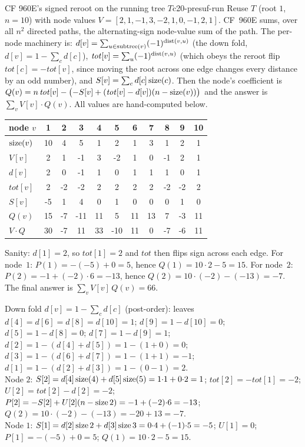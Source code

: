 \begin{example}{CF 960E's signed reroot on the running tree $T$}{c20-presuf-run}
Reuse $T$ (root $1$, $n=10$) with node values $V=[2,1,-1,3,-2,1,0,-1,2,1]$.
CF~960E sums, over all $n^2$ directed paths, the alternating-sign node-value
sum of the path. The per-node machinery is: $d[v]=\sum_{u\in\operatorname{subtree}(v)}
(-1)^{\operatorname{dist}(v,u)}$ (the down fold, $d[v]=1-\sum_c d[c]$), $\mathit{tot}[v]=
\sum_u (-1)^{\operatorname{dist}(v,u)}$ (which obeys the reroot flip $\mathit{tot}[c]=
-\mathit{tot}[v]$, since moving the root across one edge changes every distance
by an odd number), and $S[v]=\sum_c d[c]\operatorname{size}(c)$. Then the node's coefficient is
$Q(v) = n\,\mathit{tot}[v] - \bigl(-S[v] + (\mathit{tot}[v]-d[v])(n-\operatorname{size}(v))\bigr)$
and the answer is $\sum_v V[v]\cdot Q(v)$. All values are hand-computed below.
\end{example}

\begin{center}
\footnotesize
\renewcommand{\arraystretch}{1.15}
\begin{tabular}{l|cccccccccc}
\toprule
node $v$ & 1 & 2 & 3 & 4 & 5 & 6 & 7 & 8 & 9 & 10 \\
\midrule
$\operatorname{size}(v)$ & 10 & 4 & 5 & 1 & 2 & 1 & 3 & 1 & 2 & 1 \\
$V[v]$ & 2 & 1 & -1 & 3 & -2 & 1 & 0 & -1 & 2 & 1 \\
$d[v]$ & 2 & 0 & -1 & 1 & 0 & 1 & 1 & 1 & 0 & 1 \\
$\mathit{tot}[v]$ & 2 & -2 & -2 & 2 & 2 & 2 & 2 & -2 & -2 & 2 \\
$S[v]$ & -5 & 1 & 4 & 0 & 1 & 0 & 0 & 0 & 1 & 0 \\
$Q(v)$ & 15 & -7 & -11 & 11 & 5 & 11 & 13 & 7 & -3 & 11 \\
$V\!\cdot\!Q$ & 30 & -7 & 11 & 33 & -10 & 11 & 0 & -7 & -6 & 11 \\
\bottomrule
\end{tabular}
\end{center}

\noindent Sanity: $d[1]=2$, so $\mathit{tot}[1]=2$ and $\mathit{tot}$ then flips
sign across each edge. For node~$1$: $P(1)=-(-5)+0=5$, hence
$Q(1)=10{\cdot}2-5=15$. For node~$2$: $P(2)=-1+(-2){\cdot}6=-13$, hence
$Q(2)=10{\cdot}(-2)-(-13)=-7$. The final answer is $\sum_v V[v]\,Q(v)=66$.

\begin{tracebox}
Down fold $d[v]=1-\sum_{c}d[c]$ (post-order):
leaves $d[4]{=}d[6]{=}d[8]{=}d[10]{=}1$; $d[9]=1-d[10]=0$; $d[5]=1-d[8]=0$;
$d[7]=1-d[9]=1$; $d[2]=1-(d[4]{+}d[5])=1-(1{+}0)=0$;
$d[3]=1-(d[6]{+}d[7])=1-(1{+}1)=-1$; $d[1]=1-(d[2]{+}d[3])=1-(0{-}1)=2$. \checkmark\\
Node $2$: $S[2]=d[4]\operatorname{size}(4)+d[5]\operatorname{size}(5)=1{\cdot}1+0{\cdot}2=1$;
$\mathit{tot}[2]=-\mathit{tot}[1]=-2$; $U[2]=\mathit{tot}[2]-d[2]=-2$;
$P[2]=-S[2]+U[2](n-\operatorname{size} 2)=-1+(-2){\cdot}6=-13$;
$Q(2)=10{\cdot}(-2)-(-13)=-20+13=-7$. \checkmark\\
Node $1$: $S[1]=d[2]\operatorname{size} 2+d[3]\operatorname{size} 3=0{\cdot}4+(-1){\cdot}5=-5$;
$U[1]=0$; $P[1]=-(-5)+0=5$; $Q(1)=10{\cdot}2-5=15$. \checkmark
\end{tracebox}

